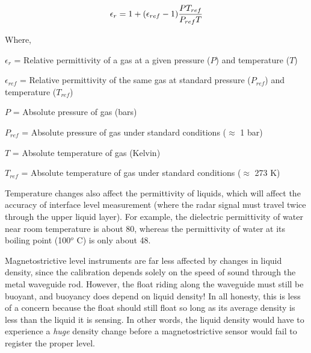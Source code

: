 $$\epsilon_r = 1 + (\epsilon_{ref} - 1) {P T_{ref} \over P_{ref} T}$$

\noindent
Where,

$\epsilon_r$ = Relative permittivity of a gas at a given pressure ($P$) and temperature ($T$)

$\epsilon_{ref}$ = Relative permittivity of the same gas at standard pressure ($P_{ref}$) and temperature ($T_{ref}$)

$P$ = Absolute pressure of gas (bars)

$P_{ref}$ = Absolute pressure of gas under standard conditions ($\approx$ 1 bar)

$T$ = Absolute temperature of gas (Kelvin)

$T_{ref}$ = Absolute temperature of gas under standard conditions ($\approx$ 273 K)

\vskip 10pt

Temperature changes also affect the permittivity of liquids, which will affect the accuracy of interface level measurement (where the radar signal must travel twice through the upper liquid layer).  For example, the dielectric permittivity of water near room temperature is about 80, whereas the permittivity of water at its boiling point (100$^{o}$ C) is only about 48.

\vskip 20pt

Magnetostrictive level instruments are far less affected by changes in liquid density, since the calibration depends solely on the speed of sound through the metal waveguide rod.  However, the float riding along the waveguide must still be buoyant, and buoyancy does depend on liquid density!  In all honesty, this is less of a concern because the float should still float so long as its average density is less than the liquid it is sensing.  In other words, the liquid density would have to experience a {\it huge} density change before a magnetostrictive sensor would fail to register the proper level.




